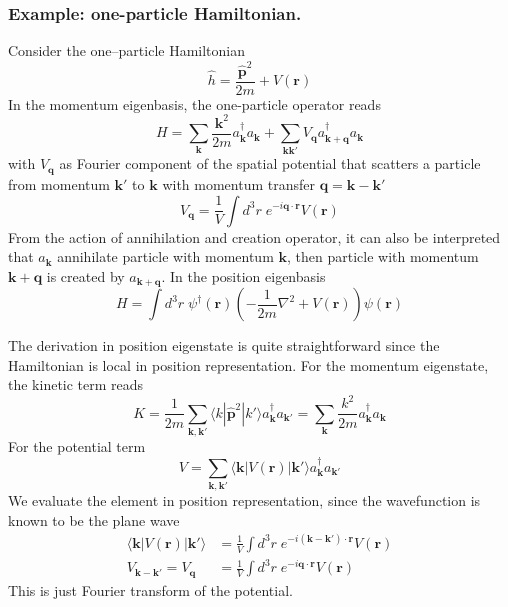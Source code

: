 \documentclass[../../../main.tex]{subfiles}
\begin{document}
\subsubsection{Example: one-particle Hamiltonian.}
Consider the one–particle Hamiltonian
\begin{equation*}
  \hat{h} = \frac{\hat{\mathbf{p}}^{2}}{2m} + V(\mathbf{r})
\end{equation*}
In the momentum eigenbasis, the one-particle operator reads
\begin{equation*}
  H = \sum_{\mathbf{k}} \frac{\mathbf{k}^{2}}{2m} a_{\mathbf{k}}^{\dagger} a_{\mathbf{k}}    + \sum_{\mathbf{k} \mathbf{k}'} V_{\mathbf{q}} a_{\mathbf{k} + \mathbf{q}}^{\dagger} a_{\mathbf{k}}
\end{equation*}
with $V_{\mathbf{q}}$ as Fourier component of the spatial potential that scatters a particle from momentum $\mathbf{k}'$ to $\mathbf{k}$ with momentum transfer $\mathbf{q}=\mathbf{k}-\mathbf{k}'$
\begin{equation*}
  V_\mathbf{q} = \frac{1 }{V } \int d^3r\; e^{- i\mathbf{q }\cdot \mathbf{r}} V(\mathbf{r})
\end{equation*}
From the action of annihilation and creation operator, it can also be interpreted that $a_{\mathbf{k}} $ annihilate particle with momentum $\mathbf{k }$, then particle with momentum $\mathbf{k}+\mathbf{q}$ is created by $a_{\mathbf{k }+\mathbf{q}}$.
In the position eigenbasis
\begin{equation*}
  H = \int d^3r\; \psi^\dagger(\mathbf r)\left(-\frac{1}{2m}\nabla^2 + V(\mathbf r)\right)\psi(\mathbf r)
\end{equation*}

The derivation in position eigenstate is quite straightforward since the Hamiltonian is local in position representation.
For the momentum eigenstate, the kinetic term  reads
\begin{equation*}
  K=\frac{1 }{2m} \sum_{\mathbf{k},\mathbf{k}'} \langle k|\hat{\mathbf{p}}^2 |k'\rangle a^\dagger_{\mathbf{k}} a_{\mathbf{k}'} = \sum_{\mathbf{k}} \frac{k^2}{2m} a^\dagger_{\mathbf{k}} a_{\mathbf{k}}
\end{equation*}
For the potential term
\begin{equation*}
  V = \sum_{\mathbf{k},\mathbf{k}'} \langle \mathbf{k}|V(\mathbf{r})|\mathbf{k}'\rangle  a_{\mathbf{k}}^\dagger a_{\mathbf{k}'}
\end{equation*}
We evaluate the element in position representation, since the wavefunction is known to be the plane wave
\begin{align*}
  \langle \mathbf{k}|V(\mathbf{r})|\mathbf{k}'\rangle & = \frac{1}{V}\int d^3r\;e^{-i(\mathbf{k}-\mathbf{k}')\cdot\mathbf{r}}V(\mathbf{r}) \\
  V_{\mathbf{k} - \mathbf{k}'} = V_{\mathbf{q}}       & = \frac{1}{V}\int d^3r\;e^{-i\mathbf{q}\cdot\mathbf{r}}V(\mathbf{r})
\end{align*}
This is just Fourier transform of the potential.
\end{document}
